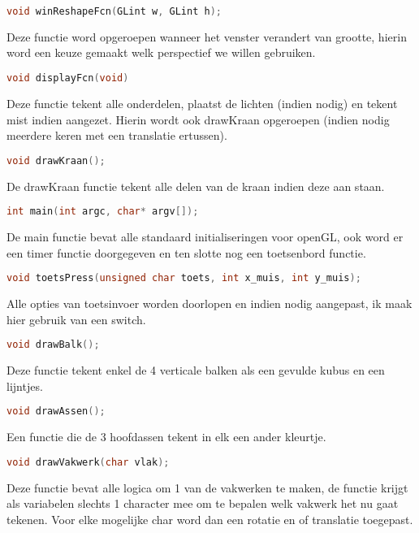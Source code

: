 \documentclass[a4paper, 12pt, one column]{article}
\begin{document}
\begin{lstlisting}[language=C]
    void winReshapeFcn(GLint w, GLint h);
\end{lstlisting}
Deze functie word opgeroepen wanneer het venster verandert van grootte, hierin word
een keuze gemaakt welk perspectief we willen gebruiken.

\begin{lstlisting}[language=C]
    void displayFcn(void)
\end{lstlisting}
Deze functie tekent alle onderdelen, plaatst de lichten (indien nodig) en tekent mist indien aangezet.
Hierin wordt ook drawKraan opgeroepen (indien nodig meerdere keren met een translatie ertussen).

\begin{lstlisting}[language=C]
    void drawKraan();
\end{lstlisting}
De drawKraan functie tekent alle delen van de kraan indien deze aan staan.

\begin{lstlisting}[language=C]
    int main(int argc, char* argv[]);
\end{lstlisting}
De main functie bevat alle standaard initialiseringen voor openGL, ook word er een timer functie 
doorgegeven en ten slotte nog een toetsenbord functie.

\begin{lstlisting}[language=C]
    void toetsPress(unsigned char toets, int x_muis, int y_muis);
\end{lstlisting}
Alle opties van toetsinvoer worden doorlopen en indien nodig aangepast, ik maak hier gebruik van 
een switch.

\begin{lstlisting}[language=C]
    void drawBalk();
\end{lstlisting}
Deze functie tekent enkel de 4 verticale balken als een gevulde kubus en een lijntjes.

\begin{lstlisting}[language=C]
    void drawAssen();
\end{lstlisting}
Een functie die de 3 hoofdassen tekent in elk een ander kleurtje.

\begin{lstlisting}[language=C]
    void drawVakwerk(char vlak);
\end{lstlisting}
Deze functie bevat alle logica om 1 van de vakwerken te maken, de functie krijgt als 
variabelen slechts 1 character mee om te bepalen welk vakwerk het nu gaat tekenen.
Voor elke mogelijke char word dan een rotatie en of translatie toegepast.
\end{document}
